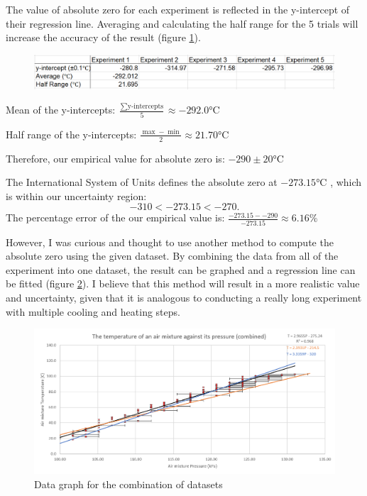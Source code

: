 \documentclass[a4paper,12pt]{article}
\begin{document}
The value of absolute zero for each experiment is reflected in the y-intercept of their regression line. Averaging and calculating the half range for the 5 trials will increase the accuracy of the result (figure \ref{fig:yi}).

\begin{figure}[H]
    \centering
    \includegraphics[scale=0.4]{assets/azerodata.png}
    \label{fig:yi}
\end{figure}


Mean of the y-intercepts: $\frac{\sum \text{y-intercepts}}{5} \approx -292.0 \si{\celsius}$

Half range of the y-intercepts: $\frac{\max - \min}{2} \approx 21.70 \si{\celsius}$

Therefore, our empirical value for absolute zero is: $-290 \pm 20 \si{\celsius}$

The International System of Units defines the absolute zero at $-273.15\si{\celsius}$ \parencite{si_form}, which is within our uncertainty region: \[-310 < -273.15 < -270.\] The percentage error of the our empirical value is: $\frac{-273.15- -290}{-273.15} \approx 6.16\%$

However, I was curious and thought to use another method to compute the absolute zero using the given dataset. By combining the data from all of the experiment into one dataset, the result can be graphed and a regression line can be fitted (figure \ref{fig:comb}). I believe that this method will result in a more realistic value and uncertainty, given that it is analogous to conducting a really long experiment with multiple cooling and heating steps.

\begin{figure}[H]
    \centering
    \includegraphics[width=\textwidth]{assets/combinedgraph.png}
    \caption{Data graph for the combination of datasets}
    \label{fig:comb}
\end{figure}
\end{document}
